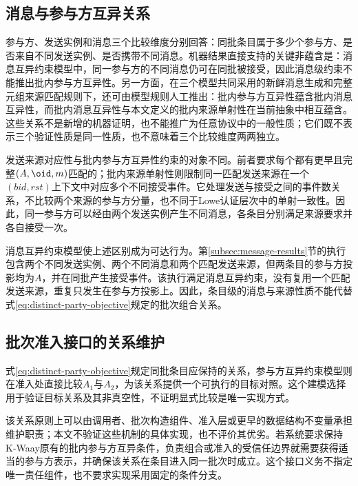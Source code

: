 \subsection{消息与参与方互异关系}
\label{subsec:relation-discussion}

参与方、发送实例和消息三个比较维度分别回答：同批条目属于多少个参与方、是否来自不同发送实例、是否携带不同消息。机器结果直接支持的关键非蕴含是：消息互异约束模型中，同一参与方的不同消息仍可在同批被接受，因此消息级约束不能推出批内参与方互异性。另一方面，在三个模型共同采用的新鲜消息生成和完整元组来源匹配规则下，还可由模型规则人工推出：批内参与方互异性蕴含批内消息互异性，而批内消息互异性与本文定义的批内来源单射性在当前抽象中相互蕴含。这些关系不是新增的机器证明，也不能推广为任意协议中的一般性质；它们既不表示三个验证性质是同一性质，也不意味着三个比较维度两两独立。

发送来源对应性与批内参与方互异性约束的对象不同。前者要求每个\receiveraccept 都有更早且完整$(A,\oid,m)$匹配的\sendaction；批内来源单射性则限制同一匹配发送来源在一个$(\mathit{bid},\mathit{rst})$上下文中对应多个不同接受事件。它处理发送与接受之间的事件数关系，不比较两个来源的参与方分量，也不同于Lowe认证层次中的单射一致性。因此，同一参与方可以经由两个发送实例产生不同消息，各条目分别满足来源要求并各自接受一次。

消息互异约束模型使上述区别成为可达行为。第\ref{subsec:message-results}节的执行包含两个不同发送实例、两个不同消息和两个匹配发送来源，但两条目的参与方投影均为$A$，并在同批产生接受事件。该执行满足消息互异约束，没有复用一个匹配发送来源，重复只发生在参与方投影上。因此，条目级的消息与来源性质不能代替式\eqref{eq:distinct-party-objective}规定的批次组合关系。

\subsection{批次准入接口的关系维护}
\label{subsec:interface-maintenance}

式\eqref{eq:distinct-party-objective}规定同批条目应保持的关系，参与方互异约束模型则在准入处直接比较$A_1$与$A_2$，为该关系提供一个可执行的目标对照。这个建模选择用于验证目标关系及其非真空性，不证明显式比较是唯一实现方式。

该关系原则上可以由调用者、批次构造组件、准入层或更早的数据结构不变量承担维护职责；本文不验证这些机制的具体实现，也不评价其优劣。若系统要求保持K-Waay原有的批内参与方互异条件，负责组合或准入的受信任边界就需要获得适当的参与方表示，并确保该关系在条目进入同一批次时成立。这个接口义务不指定唯一责任组件，也不要求实现采用固定的条件分支。

